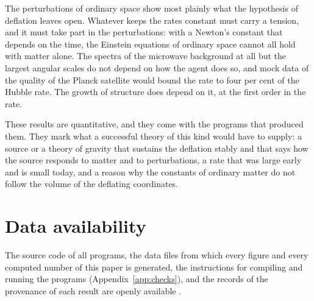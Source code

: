 The perturbations of ordinary space show most plainly what the hypothesis of deflation leaves open.
Whatever keeps the rates constant must carry a tension, and it must take part in the perturbations:
with a Newton's constant that depends on the time, the Einstein equations of ordinary space cannot
all hold with matter alone. The spectra of the microwave background at all but the largest angular
scales do not depend on how the agent does so, and mock data of the quality of the Planck satellite
would bound the rate to four per cent of the Hubble rate. The growth of structure does depend on it,
at the first order in the rate.

These results are quantitative, and they come with the programs that produced them. They mark what
a successful theory of this kind would have to supply: a source or a theory of gravity that sustains
the deflation stably and that says how the source responds to matter and to perturbations, a rate that was large early
and is small today, and a reason why the constants of ordinary matter do not follow the volume of
the deflating coordinates.

\section*{Data availability}

The source code of all programs, the data files from which every figure and every computed number of
this paper is generated, the instructions for compiling and running the programs
(Appendix~\ref{app:checks}), and the records of the provenance of each result are openly available
\cite{DeflationRepo}.

